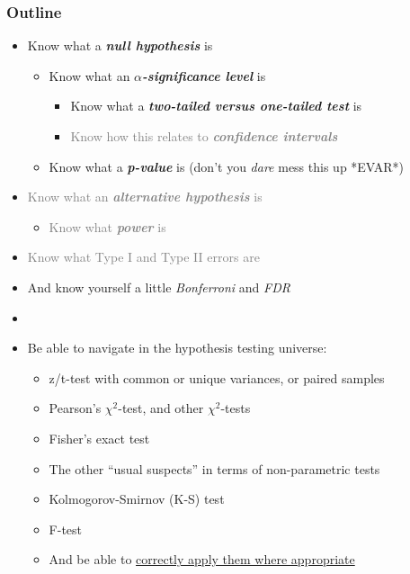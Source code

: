 \documentclass[xcolor={dvipsnames}]{beamer}
\begin{document}
\frame
{
 \frametitle{Outline}

\begin{itemize}
\item Know what a \textbf{\emph{null hypothesis}} is
\begin{itemize}
\item Know what an \textbf{\emph{$\alpha$-significance level}} is
\begin{itemize} 
\item Know what a \textbf{\emph{two-tailed versus one-tailed test}} is
\item \textcolor{gray}{Know how this relates to \textbf{\emph{confidence intervals}}}
\end{itemize}
\item Know what a \textbf{\emph{p-value}} is (don't you \emph{dare} mess this up *EVAR*)
\end{itemize}
\item \textcolor{gray}{Know what an \textbf{\emph{alternative hypothesis}} is}
\begin{itemize}
\item \textcolor{gray}{Know what \textbf{\emph{power}} is}
\end{itemize}
\item \textcolor{gray}{Know what Type I and Type II errors are}
\item And know yourself a little \emph{Bonferroni} and \emph{FDR}
\item[]

\item  \textcolor{NavyBlue}{Be able to navigate in the hypothesis testing universe: }  
\begin{itemize}
\color{NavyBlue}
\item z/t-test with common or unique variances, or paired samples
\item Pearson's $\chi^2$-test, and other $\chi^2$-tests
\item Fisher's exact test
\item The other ``usual suspects'' in terms of non-parametric tests
\item Kolmogorov-Smirnov (K-S) test
\item F-test
\item And be able to \underline{correctly apply them where appropriate}
\end{itemize}
\end{itemize}

}
\end{document}
